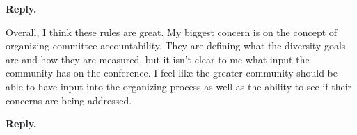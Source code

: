 \documentclass{article}
\newenvironment{Reply}{\noindent\color{BlueViolet}\textbf{Reply.}}{\vspace{1em}}
\begin{document}
\begin{Reply}


\end{Reply}

Overall, I think these rules are great. My biggest concern is on the concept of organizing committee accountability. They are defining what the diversity goals are and how they are measured, but it isn't clear to me what input the community has on the conference. I feel like the greater community should be able to have input into the organizing process as well as the ability to see if their concerns are being addressed.

\begin{Reply}

\end{Reply}
\end{document}
